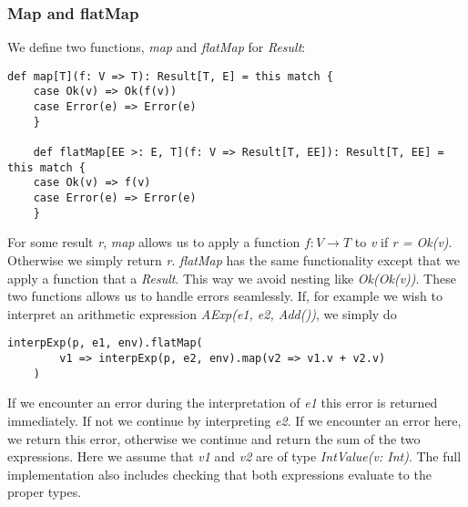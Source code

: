 \subsubsection{Map and flatMap}

We define two functions, \textsl{map} and \textsl{flatMap} for \textsl{Result}:

\begin{lstlisting}[style=simple]
	def map[T](f: V => T): Result[T, E] = this match {
	case Ok(v) => Ok(f(v))
	case Error(e) => Error(e)
	}
	
	def flatMap[EE >: E, T](f: V => Result[T, EE]): Result[T, EE] = this match {
	case Ok(v) => f(v)
	case Error(e) => Error(e)
	}
\end{lstlisting}
For some result \textsl{r}, \textsl{map} allows us to apply a function $f: V \rightarrow T$ to \textsl{v} if \textsl{r = Ok(v)}. Otherwise we simply return \textsl{r}. \textsl{flatMap} has the same functionality except that we apply a function that a \textsl{Result}. This way we avoid nesting like \textsl{Ok(Ok(v))}. These two functions allows us to handle errors seamlessly. If, for example we wish to interpret an arithmetic expression \textsl{AExp(e1, e2, Add())}, we simply do 

\begin{lstlisting}[style=simple]
	interpExp(p, e1, env).flatMap(
		v1 => interpExp(p, e2, env).map(v2 => v1.v + v2.v)
	)
\end{lstlisting}
If we encounter an error during the interpretation of \textsl{e1} this error is returned immediately. If not we continue by interpreting \textsl{e2}. If we encounter an error here, we return this error, otherwise we continue and return the sum of the two expressions. Here we assume that \textsl{v1} and \textsl{v2} are of type \textsl{IntValue(v: Int)}. The full implementation also includes checking that both expressions evaluate to the proper types.


